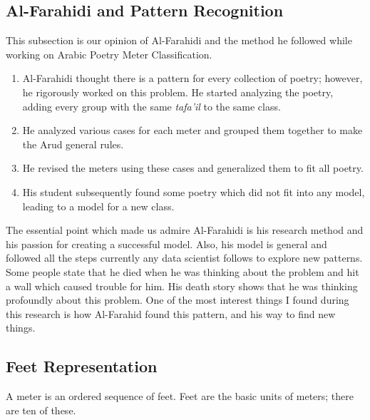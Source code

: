 \subsection{Al-Farahidi and Pattern Recognition}

This subsection is our opinion of Al-Farahidi and the method he followed while working on Arabic Poetry Meter Classification.

\begin{enumerate}
  \item Al-Farahidi thought there is a pattern for every collection of poetry; however, he rigorously worked on this problem. He started analyzing the poetry, adding every group with the same \textit{tafa'il} to the same class.
  \item  He analyzed various cases for each meter and grouped them together to make the Arud general rules.
  \item He revised the meters using these cases and generalized them to fit all poetry.
  \item His student subsequently found some poetry which did not fit into any model, leading to a model for a new class.
\end{enumerate}

The essential point which made us admire Al-Farahidi is his research method and his passion for creating a successful model. Also, his model is general and followed all the steps currently any data scientist follows to explore new patterns. Some people state that he died when he was thinking about the problem and hit a wall which caused trouble for him. His death story shows that he was thinking profoundly about this problem. One of the most interest things I found during this research is how Al-Farahid found this pattern, and his way to find new things.

\subsection{Feet Representation}
A meter is an ordered sequence of feet. Feet are the basic units of meters; there are ten of these.

